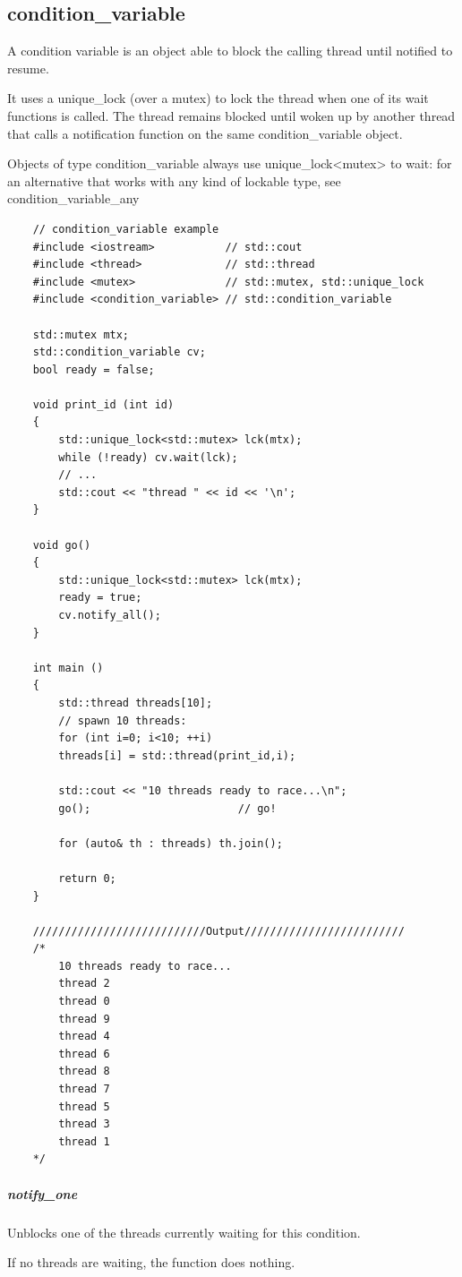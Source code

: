 \documentclass[UTF8,a4paper,12pt]{ctexbook}
\begin{document}
	\subsection{condition\_variable}
		A condition variable is an object able to block the calling thread until notified to resume.
		
		It uses a unique\_lock (over a mutex) to lock the thread when one of its wait functions is called. The thread remains blocked until woken up by another thread that calls a notification function on the same condition\_variable object.
		
		Objects of type condition\_variable always use unique\_lock<mutex> to wait: for an alternative that works with any kind of lockable type, see condition\_variable\_any
		
\begin{lstlisting}
	// condition_variable example
	#include <iostream>           // std::cout
	#include <thread>             // std::thread
	#include <mutex>              // std::mutex, std::unique_lock
	#include <condition_variable> // std::condition_variable
	
	std::mutex mtx;
	std::condition_variable cv;
	bool ready = false;
	
	void print_id (int id) 
	{
		std::unique_lock<std::mutex> lck(mtx);
		while (!ready) cv.wait(lck);
		// ...
		std::cout << "thread " << id << '\n';
	}
	
	void go() 
	{
		std::unique_lock<std::mutex> lck(mtx);
		ready = true;
		cv.notify_all();
	}
	
	int main ()
	{
		std::thread threads[10];
		// spawn 10 threads:
		for (int i=0; i<10; ++i)
		threads[i] = std::thread(print_id,i);
		
		std::cout << "10 threads ready to race...\n";
		go();                       // go!
		
		for (auto& th : threads) th.join();
		
		return 0;
	}
	
	///////////////////////////Output/////////////////////////
	/*
		10 threads ready to race...
		thread 2
		thread 0
		thread 9
		thread 4
		thread 6
		thread 8
		thread 7
		thread 5
		thread 3
		thread 1
	*/
\end{lstlisting}
		\subparagraph{notify\_one}Unblocks one of the threads currently waiting for this condition.
		
		If no threads are waiting, the function does nothing.
		
\end{document}
